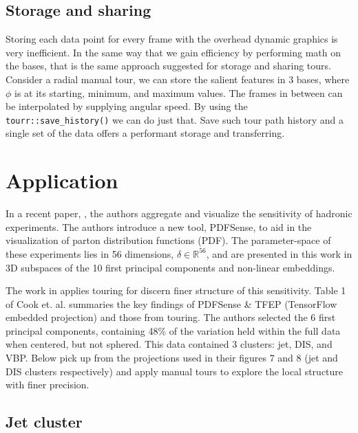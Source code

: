 \documentclass{monashthesis}
\begin{document}
\subsection{Storage and sharing}\label{storage-and-sharing-1}

Storing each data point for every frame with the overhead dynamic
graphics is very inefficient. In the same way that we gain efficiency by
performing math on the bases, that is the same approach suggested for
storage and sharing tours. Consider a radial manual tour, we can store
the salient features in 3 bases, where \(\phi\) is at its starting,
minimum, and maximum values. The frames in between can be interpolated
by supplying angular speed. By using the \texttt{tourr::save\_history()}
we can do just that. Save such tour path history and a single set of the
data offers a performant storage and transferring.

\section{Application}\label{sec:application}

In a recent paper, \textcite{wang_visualizing_2018}, the authors
aggregate and visualize the sensitivity of hadronic experiments. The
authors introduce a new tool, PDFSense, to aid in the visualization of
parton distribution functions (PDF). The parameter-space of these
experiments lies in 56 dimensions, \(\delta \in \mathbb{R}^{56}\), and
are presented in this work in 3D subspaces of the 10 first principal
components and non-linear embeddings.

The work in \textcite{cook_dynamical_2018} applies touring for discern
finer structure of this sensitivity. Table 1 of Cook et. al. summaries
the key findings of PDFSense \& TFEP (TensorFlow embedded projection)
and those from touring. The authors selected the 6 first principal
components, containing 48\% of the variation held within the full data
when centered, but not sphered. This data contained 3 clusters: jet,
DIS, and VBP. Below pick up from the projections used in their figures 7
and 8 (jet and DIS clusters respectively) and apply manual tours to
explore the local structure with finer precision.

\subsection{Jet cluster}\label{jet-cluster}
\end{document}
